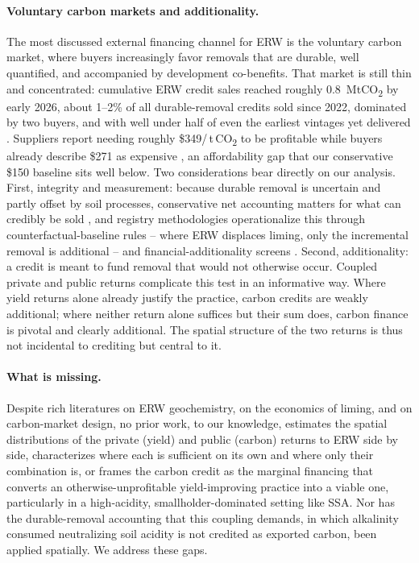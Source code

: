 \documentclass[12pt]{article}
\newcommand{\tco}{\,t\,CO\textsubscript{2}}
\newcommand{\co}{CO\textsubscript{2}}
\begin{document}
\paragraph{Voluntary carbon markets and additionality.}
The most discussed external financing channel for ERW is the voluntary carbon
market, where buyers increasingly favor removals that are durable, well
quantified, and accompanied by development co-benefits. That market is still
thin and concentrated: cumulative ERW credit sales reached roughly 0.8~Mt\co{}
by early 2026, about 1--2\% of all durable-removal credits sold since 2022,
dominated by two buyers, and with well under half of even the earliest vintages
yet delivered \citep[\S5.3]{suhrhoff2026esroc}. Suppliers report needing roughly
\$349/\tco{} to be profitable while buyers already describe \$271 as expensive
\citep[\S6.3]{suhrhoff2026esroc}, an affordability gap that our conservative
\$150 baseline sits well below. Two considerations bear
directly on our analysis. First, integrity and measurement: because durable
removal is uncertain and partly offset by soil processes, conservative net
accounting matters for what can credibly be sold \citep{schiedung2026,levy2024},
and registry methodologies operationalize this through counterfactual-baseline
rules -- where ERW displaces liming, only the incremental removal is additional
-- and financial-additionality screens \citep{suhrhoff2026esroc}.
Second, additionality: a credit is meant to fund removal that would not otherwise
occur. Coupled private and public returns complicate this test in an informative
way. Where yield returns alone already justify the practice, carbon credits are
weakly additional; where neither return alone suffices but their sum does, carbon
finance is pivotal and clearly additional. The spatial structure of the two
returns is thus not incidental to crediting but central to it.

\paragraph{What is missing.}
Despite rich literatures on ERW geochemistry, on the economics of liming, and on
carbon-market design, no prior work, to our knowledge, estimates the spatial
distributions of the private (yield) and public (carbon) returns to ERW side by
side, characterizes where each is sufficient on its own and where only their
combination is, or frames the carbon credit as the marginal financing that
converts an otherwise-unprofitable yield-improving practice into a viable one,
particularly in a high-acidity, smallholder-dominated setting like SSA. Nor has
the durable-removal accounting that this coupling demands, in which alkalinity
consumed neutralizing soil acidity is not credited as exported carbon, been
applied spatially. We address these gaps.
\end{document}
